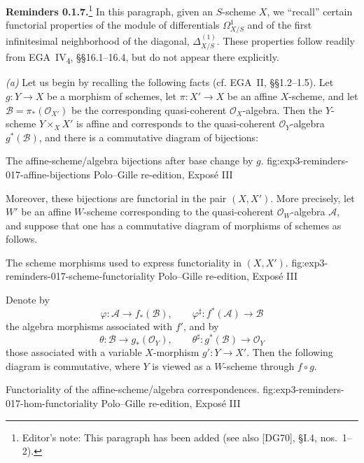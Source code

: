 
\medskip
\noindent{}\textbf{Reminders 0.1.7.}\footnote{Editor's note: This
paragraph has been added (see also [DG70], \S I.4, nos.~1--2).}
In this paragraph, given an \(S\)-scheme \(X\), we ``recall'' certain
functorial properties of the module of differentials
\(\Omega^1_{X/S}\) and of the first infinitesimal neighborhood of the
diagonal, \(\Delta^{(1)}_{X/S}\). These properties follow readily from
EGA~IV\textsubscript{4}, \S\S16.1--16.4, but do not appear there
explicitly.

\smallskip
\noindent\textit{(a)} Let us begin by recalling the following facts
(cf. EGA~II, \S\S1.2--1.5). Let \(g:Y\to X\) be a morphism of schemes,
let \(\pi:X'\to X\) be an affine \(X\)-scheme, and let
\(\mathscr B=\pi_*(\mathscr O_{X'})\) be the corresponding
quasi-coherent \(\mathscr O_X\)-algebra. Then the \(Y\)-scheme
\(Y\times_X X'\) is affine and corresponds to the quasi-coherent
\(\mathscr O_Y\)-algebra \(g^*(\mathscr B)\), and there is a
commutative diagram of bijections:

  {The affine-scheme/algebra bijections after base change by \(g\).}
  {fig:exp3-reminders-017-affine-bijections}
  {Polo--Gille re-edition, Expos\'e III}

Moreover, these bijections are functorial in the pair \((X,X')\). More
precisely, let \(W'\) be an affine \(W\)-scheme corresponding to the
quasi-coherent \(\mathscr O_W\)-algebra \(\mathscr A\), and suppose that
one has a commutative diagram of morphisms of schemes as follows.

  {The scheme morphisms used to express functoriality in \((X,X')\).}
  {fig:exp3-reminders-017-scheme-functoriality}
  {Polo--Gille re-edition, Expos\'e III}

Denote by
\[
 \varphi:\mathscr A\longrightarrow f_*(\mathscr B),
 \qquad
 \varphi^\sharp:f^*(\mathscr A)\longrightarrow\mathscr B
\]
the algebra morphisms associated with \(f'\), and by
\[
 \theta:\mathscr B\longrightarrow g_*(\mathscr O_Y),
 \qquad
 \theta^\sharp:g^*(\mathscr B)\longrightarrow\mathscr O_Y
\]
those associated with a variable \(X\)-morphism \(g':Y\to X'\).
Then the following diagram is commutative, where \(Y\) is viewed as a
\(W\)-scheme through \(f\circ g\).

  {Functoriality of the affine-scheme/algebra correspondences.}
  {fig:exp3-reminders-017-hom-functoriality}
  {Polo--Gille re-edition, Expos\'e III}

